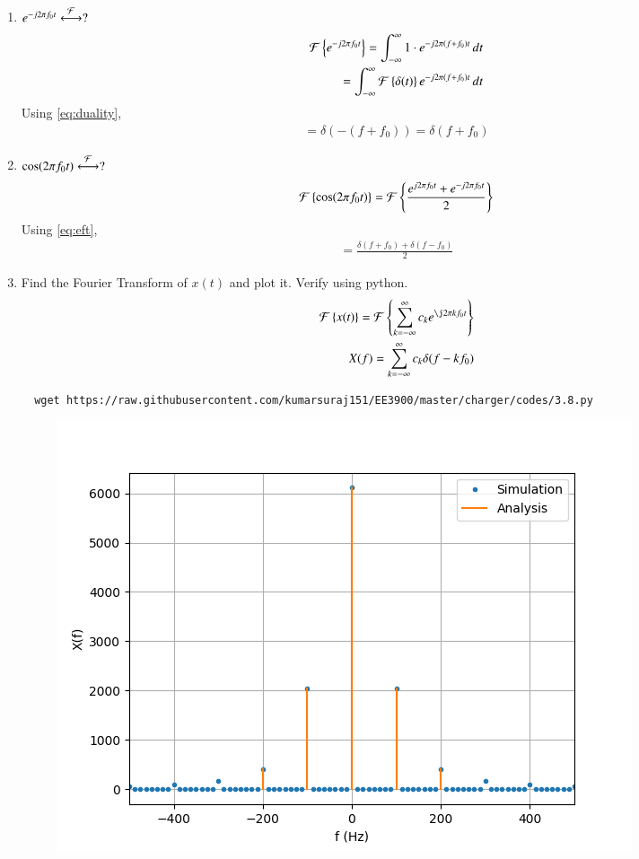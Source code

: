 \documentclass[journal,12pt,twocolumn]{IEEEtran}
\renewcommand\thesection{\arabic{section}}
\begin{document}
\begin{enumerate}[label=\thesection.\arabic*
,ref=\thesection.\theenumi]
\begin{align}
 \end{align}
 Since $e^{-j2\pi ft}=1$ for t=0 and remaining integrand is zero for t $\neq0$.
 \begin{align}
  =\int_{-\infty}^{\infty}\delta(t)\,dt\\
  =1
 \end{align}
 \item $e^{-j2\pi f_0t}\overset{\mathcal{F}}{ \longleftrightarrow}?$\\
 \solution 
 \begin{align}
 \mathcal{F}\left\{e^{-j2\pi f_0t}\right\}=\int_{-\infty}^{\infty}1\cdot e^{-j2\pi\left(f+f_0\right)t}\,dt\\
 =\int_{-\infty}^{\infty}\mathcal{F}\left\{\delta(t)\right\} e^{-j2\pi\left(f+f_0\right)t}\,dt
 \end{align}
 Using \eqref{eq:duality},
 \begin{align}
 \label{eq:eft}
 =\delta(-(f+f_0))=\delta(f+f_0)
 \end{align}
 \item $\cos(2\pi f_0t)\overset{\mathcal{F}}{ \longleftrightarrow}?$\\
 \solution
 \begin{align}
 \mathcal{F}\left\{\cos(2\pi f_0t)\right\}=\mathcal{F}\left\{\frac{{e^{j2\pi f_0t}+e^{-j2\pi f_0t}}}{2}\right\}
 \end{align}
 Using \eqref{eq:eft},
 \begin{align}
 =\frac{\delta(f+f_0)+\delta(f-f_0)}{2}
 \end{align}
 \item Find the Fourier Transform of $x(t)$ and plot it.  Verify using python.\\
 \solution
 \begin{align}
  \foutranin{x(t)}=\foutranin{\sum_{k = -\infty}^{\infty}c_ke^{\j2\pi kf_0 t}}\\
  X(f)=\sum_{k = -\infty}^{\infty}c_k\delta(f-kf_0)
  \end{align}
  \begin{lstlisting}
  wget https://raw.githubusercontent.com/kumarsuraj151/EE3900/master/charger/codes/3.8.py
  \end{lstlisting}
  \begin{figure}[!ht]
    \centering
    \includegraphics[width=\columnwidth]{./figs/3.8}

\end{figure}
\end{enumerate}
\end{document}
